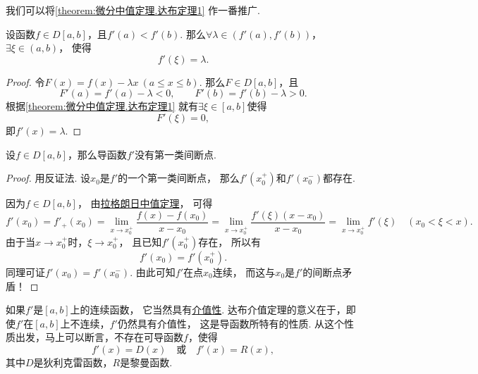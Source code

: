 我们可以将\cref{theorem:微分中值定理.达布定理1} 作一番推广.
\begin{theorem}[达布介值定理]\label{theorem:微分中值定理.达布定理2}
设函数\(f \in D[a,b]\)，且\(f'(a) < f'(b)\).
那么\(\forall\lambda\in(f'(a),f'(b))\)，\(\exists\xi\in(a,b)\)，
使得\begin{equation*}
	f'(\xi) = \lambda.
\end{equation*}
\begin{proof}
令\(F(x) = f(x) - \lambda x\ (a \leq x \leq b)\).
那么\(F \in D[a,b]\)，且\begin{equation*}
	F'(a) = f'(a) - \lambda < 0, \qquad
	F'(b) = f'(b) - \lambda > 0.
\end{equation*}
根据\cref{theorem:微分中值定理.达布定理1} 就有\(\exists\xi\in[a,b]\)使得\begin{equation*}
	F'(\xi)=0,
\end{equation*}
即\(f'(x) = \lambda\).
\end{proof}
\end{theorem}

\begin{theorem}
设\(f \in D[a,b]\)，那么导函数\(f'\)没有第一类间断点.
\begin{proof}
用反证法.
设\(x_0\)是\(f'\)的一个第一类间断点，
那么\(f'(x_0^+)\)和\(f'(x_0^-)\)都存在.

因为\(f \in D[a,b]\)，
由\hyperref[theorem:微分中值定理.拉格朗日中值定理]{拉格朗日中值定理}，
可得\begin{equation*}
	f'(x_0)
	= f'_+(x_0)
	= \lim_{x \to x_0^+} \frac{f(x)-f(x_0)}{x-x_0}
	= \lim_{x \to x_0^+} \frac{f'(\xi) (x-x_0)}{x-x_0}
	= \lim_{x \to x_0^+} f'(\xi)
	\quad(x_0<\xi<x).
\end{equation*}
由于当\(x \to x_0^+\)时，\(\xi \to x_0^+\)，
且已知\(f'(x_0^+)\)存在，
所以有\begin{equation*}
	f'(x_0)=f'(x_0^+).
\end{equation*}
同理可证\(f'(x_0)=f'(x_0^-)\).
由此可知\(f'\)在点\(x_0\)连续，
而这与\(x_0\)是\(f'\)的间断点矛盾！
\end{proof}
\end{theorem}
\begin{remark}
如果\(f'\)是\([a,b]\)上的连续函数，
它当然具有\hyperref[theorem:极限.闭区间上连续函数的性质.介值定理1]{介值性}.
达布介值定理的意义在于，即使\(f'\)在\([a,b]\)上不连续，\(f'\)仍然具有介值性，
这是导函数所特有的性质.
从这个性质出发，马上可以断言，不存在可导函数\(f\)，使得\begin{equation*}
	f'(x) = D(x)
	\quad\text{或}\quad
	f'(x) = R(x),
\end{equation*}
其中\(D\)是狄利克雷函数，\(R\)是黎曼函数.
\end{remark}

